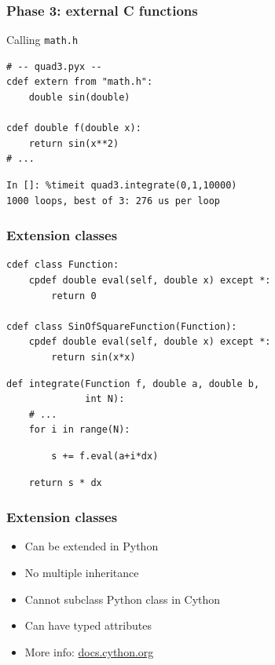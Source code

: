 \documentclass[14pt,compress]{beamer}
\newcounter{time}
\newcommand{\inctime}[1]{\addtocounter{time}{#1}{\tiny \thetime\ m}}
\newcommand{\typ}[1]{\lstinline{#1}}
\begin{document}
\begin{frame}[fragile]
    \frametitle{Phase 3: external C functions}
    Calling \typ{math.h}
\begin{lstlisting}
# -- quad3.pyx --
cdef extern from "math.h":
    double sin(double)

cdef double f(double x):
    return sin(x**2)
# ...
\end{lstlisting}

\begin{lstlisting}
In []: %timeit quad3.integrate(0,1,10000)
1000 loops, best of 3: 276 us per loop
\end{lstlisting}
\end{frame}


\begin{frame}[fragile]
    \frametitle{Extension classes}
    \small
\begin{lstlisting}
cdef class Function:
    cpdef double eval(self, double x) except *:
        return 0

cdef class SinOfSquareFunction(Function):
    cpdef double eval(self, double x) except *:
        return sin(x*x)

\end{lstlisting}
\pause
\begin{lstlisting}
def integrate(Function f, double a, double b, 
              int N):
    # ...
    for i in range(N):
\end{lstlisting}
\vspace*{-1em}
\begin{lstlisting}
        s += f.eval(a+i*dx)
\end{lstlisting}
\vspace*{-1em}
\begin{lstlisting}
    return s * dx
\end{lstlisting}
\end{frame}

\begin{frame}
    \frametitle{Extension classes}
    \begin{itemize}
        \item Can be extended in Python
        \item No multiple inheritance
        \item Cannot subclass Python class in Cython
        \item Can have typed attributes
        \item More info: \url{docs.cython.org}
    \end{itemize}
    \inctime{10}
\end{frame}
\end{document}
